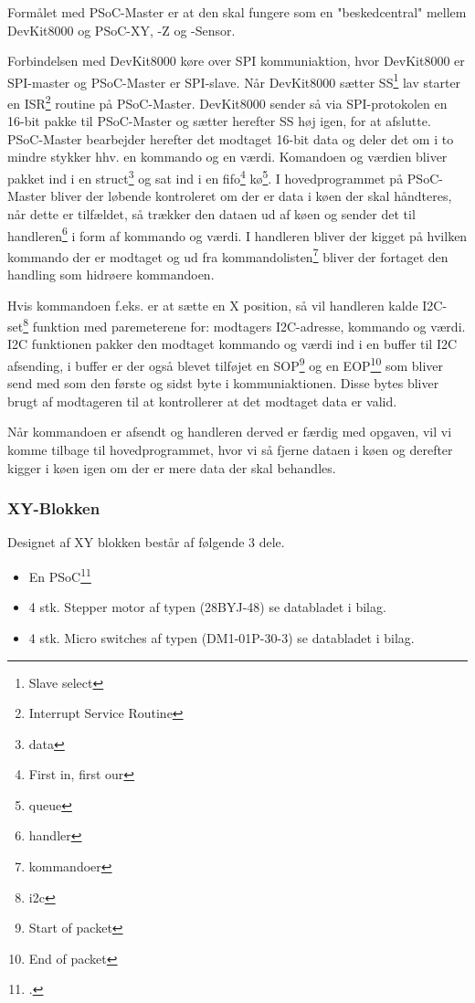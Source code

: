 Formålet med PSoC-Master er at den skal fungere som en "beskedcentral" mellem DevKit8000 og PSoC-XY, -Z og -Sensor.

Forbindelsen med DevKit8000 køre over SPI kommuniaktion, hvor DevKit8000 er SPI-master og PSoC-Master er SPI-slave. Når DevKit8000 sætter SS\footnote{Slave select} lav starter en ISR\footnote{Interrupt Service Routine} routine på PSoC-Master. DevKit8000 sender så via SPI-protokolen en 16-bit pakke til PSoC-Master og sætter herefter SS høj igen, for at afslutte.
PSoC-Master bearbejder herefter det modtaget 16-bit data og deler det om i to mindre stykker hhv. en kommando og en værdi.
Komandoen og værdien bliver pakket ind i en struct\footnote{data} og sat ind i en fifo\footnote{First in, first our} kø\footnote{queue}.
I hovedprogrammet på PSoC-Master bliver der løbende kontroleret om der er data i køen der skal håndteres, når dette er tilfældet, så trækker den dataen ud af køen og sender det til handleren\footnote{handler} i form af kommando og værdi. I handleren bliver der kigget på hvilken kommando der er modtaget og ud fra kommandolisten\footnote{kommandoer} bliver der fortaget den handling som hidrøere kommandoen. 

Hvis kommandoen f.eks. er at sætte en X position, så vil handleren kalde I2C-set\footnote{i2c} funktion med paremeterene for: modtagers I2C-adresse, kommando og værdi. I2C funktionen pakker den modtaget kommando og værdi ind i en buffer til I2C afsending, i buffer er der også blevet tilføjet en SOP\footnote{Start of packet} og en EOP\footnote{End of packet} som bliver send med som den første og sidst byte i kommuniaktionen. Disse bytes bliver brugt af modtageren til at kontrollerer at det modtaget data er valid.

Når kommandoen er afsendt og handleren derved er færdig med opgaven, vil vi komme tilbage til hovedprogrammet, hvor vi så fjerne dataen i køen og derefter kigger i køen igen om der er mere data der skal behandles.

\subsubsection{XY-Blokken}

Designet af XY blokken består af følgende 3 dele.

\begin{itemize}
    \item En PSoC\footcite{psoc}
    \item 4 stk. Stepper motor af typen (28BYJ-48) se databladet i bilag.
    \item 4 stk. Micro switches af typen (DM1-01P-30-3) se databladet i bilag.
\end{itemize}

